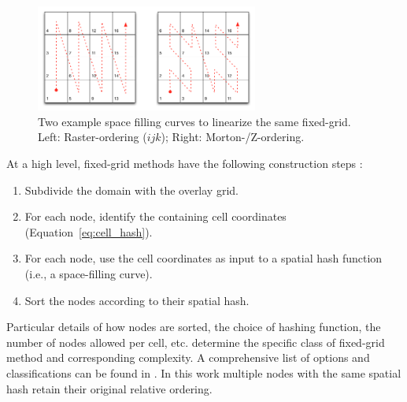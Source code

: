 \documentclass{report}
\begin{document}
\begin{figure}
\centering
\includegraphics[width=0.65\textwidth]{rbffd_methods_content/neighbors/space_filling_curves.png}
\caption{Two example space filling curves to linearize the same fixed-grid. Left: Raster-ordering ($ijk$); Right: Morton-/Z-ordering.}
\label{fig:space_filling_curves}
\end{figure} 


At a high level, fixed-grid methods have the following construction steps \cite{Krog2010}:
\begin{enumerate}
\item Subdivide the domain with the overlay grid.
\item For each node, identify the containing cell coordinates (Equation~\ref{eq:cell_hash}).
\item For each node, use the cell coordinates as input to a spatial hash function (i.e., a space-filling curve).
\item Sort the nodes according to their spatial hash. 
\end{enumerate}
Particular details of how nodes are sorted, the choice of hashing function, the number of nodes allowed per cell, etc. determine the specific class of fixed-grid method and corresponding complexity. A comprehensive list of options and classifications can be found in \cite{Samet2005}. In this work multiple nodes with the same spatial hash retain their original relative ordering.
\end{document}
